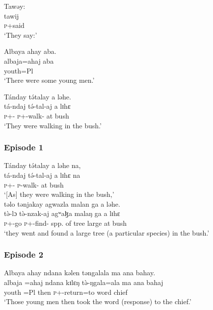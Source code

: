 \ea Tawəy: \\
\gll   tawij \\
\textsc{p}+said  \\  
\glt ‘They say:’
  \z

\ea Albaya  ahay  aba.\\
 \gll albaja=ahaj              aba\\
        youth=Pl    {\EXT}\\
 \glt ‘There were some young men.’
  \z

\ea Tánday  t\'ətalay  a  ləhe.\\
 \gll tá{}-ndaj         t\'ə{}-tal-aj           a  lɪhɛ\\
   \textsc{p}+{\IFV}-{\PRG}   \textsc{p}+{\IFV}-walk{}-{\CL}   at    bush\\
 \glt ‘They were walking in the bush.’
 \z
 \subsubsection*{Episode 1}
\ea      Tánday  t\'ətalay  a  ləhe  na,\\
\gll tá-ndaj        t\'ə-tal-aj    a   lɪhɛ     na\\
  \textsc{p}+{\IFV}-{\PRG}   \textsc{p}-walk{}-{\CL}   at  bush   {\PSP}\\
\glt ‘[As] they were walking in the bush,’\\
         
     \medskip
təlo  tənjakay  agwazla  malan  ga  a  ləhe.  \\
\gll t\`ə-lɔ           t\`ə-nzak-aj        agʷaɮa   malaŋ  ga      a    lɪhɛ\\
 \textsc{p}+{\PFV}-go   \textsc{p}+{\PFV}-find{}-{\CL}   {spp. of tree}     large   {\ADJ}  at   bush\\
\glt `they went and found a large tree (a particular species) in the bush.’
 \z
\subsubsection*{Episode 2}
\ea Albaya  ahay  ndana  kəlen  təngalala  ma  ana  bahay.  \\
\gll albaja  =ahaj  ndana  kɪlɛŋ  t\`ə-ŋgala=ala     ma    ana      bahaj\\
          youth    =Pl       {\DEM}  then \textsc{p}+{\PFV}-return=to  word    {\DAT} chief\\
        \glt ‘Those young men then took the word (response) to the chief.’  
 \z

